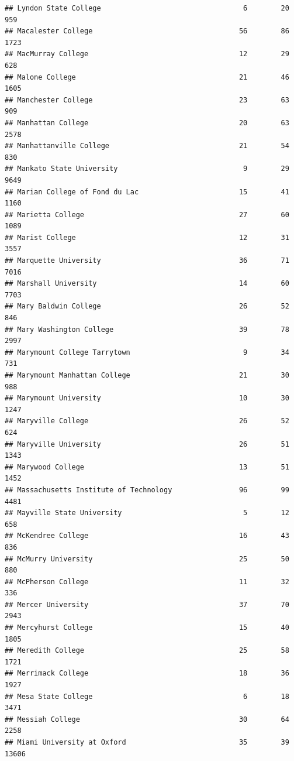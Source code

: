 \documentclass[
]{article}
\begin{document}
\begin{verbatim}
## Lyndon State College                                  6        20         959
## Macalester College                                   56        86        1723
## MacMurray College                                    12        29         628
## Malone College                                       21        46        1605
## Manchester College                                   23        63         909
## Manhattan College                                    20        63        2578
## Manhattanville College                               21        54         830
## Mankato State University                              9        29        9649
## Marian College of Fond du Lac                        15        41        1160
## Marietta College                                     27        60        1089
## Marist College                                       12        31        3557
## Marquette University                                 36        71        7016
## Marshall University                                  14        60        7703
## Mary Baldwin College                                 26        52         846
## Mary Washington College                              39        78        2997
## Marymount College Tarrytown                           9        34         731
## Marymount Manhattan College                          21        30         988
## Marymount University                                 10        30        1247
## Maryville College                                    26        52         624
## Maryville University                                 26        51        1343
## Marywood College                                     13        51        1452
## Massachusetts Institute of Technology                96        99        4481
## Mayville State University                             5        12         658
## McKendree College                                    16        43         836
## McMurry University                                   25        50         880
## McPherson College                                    11        32         336
## Mercer University                                    37        70        2943
## Mercyhurst College                                   15        40        1805
## Meredith College                                     25        58        1721
## Merrimack College                                    18        36        1927
## Mesa State College                                    6        18        3471
## Messiah College                                      30        64        2258
## Miami University at Oxford                           35        39       13606

\end{verbatim}
\end{document}
